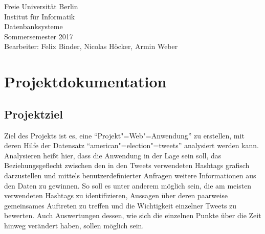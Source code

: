 \documentclass[BCOR0mm,fontsize=12pt,paper=a4,final,numbers=noenddot]{scrartcl}
\begin{document}
\makeatletter         

\renewcommand*{\thesubsection}{\@arabic\c@subsection.}
\titleformat{\section}[hang]{\sffamily\bfseries\LARGE\centering}{\thesection}{5pt}{}
\titleformat{\subsection}[hang]{\sffamily\bfseries\Large}{\thesubsection}{5pt}{}


\makeatother


\setlength{\baselineskip}{11pt}

\noindent{}\begin{footnotesize}Freie Universität Berlin\\
Institut für Informatik\\
Datenbanksysteme\\
Sommersemester 2017\\
Bearbeiter: Felix Binder, Nicolas Höcker, Armin Weber\\
\end{footnotesize}

\setlength{\baselineskip}{12pt}

\bigskip

\section*{Projektdokumentation}

\onehalfspacing

\subsection{Projektziel}

Ziel des Projekts ist es, eine "`Projekt"=Web"=Anwendung"' zu erstellen, mit deren Hilfe der Datensatz "`american"=election"=tweets"' analysiert werden kann. Analysieren heißt hier, dass die Anwendung in der Lage sein soll, das Beziehungsgeflecht zwischen den in den Tweets verwendeten Hashtags grafisch darzustellen und mittels benutzerdefinierter Anfragen weitere Informationen aus den Daten zu gewinnen. So soll es unter anderem möglich sein, die am meisten verwendeten Hashtags zu identifizieren, Aussagen über deren paarweise gemeinsames Auftreten zu treffen und die Wichtigkeit einzelner Tweets zu bewerten. Auch Auswertungen dessen, wie sich die einzelnen Punkte über die Zeit hinweg verändert haben, sollen möglich sein.
\end{document}
